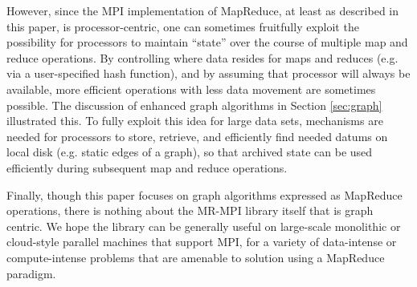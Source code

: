However, since the MPI implementation of MapReduce, at least as
described in this paper, is processor-centric, one can sometimes
fruitfully exploit the possibility for processors to maintain
``state'' over the course of multiple map and reduce operations.  By
controlling where data resides for maps and reduces (e.g. via a
user-specified hash function), and by assuming that processor will
always be available, more efficient operations with less data movement
are sometimes possible.  The discussion of enhanced graph algorithms
in Section \ref{sec:graph} illustrated this.  To fully exploit this
idea for large data sets, mechanisms are needed for processors to
store, retrieve, and efficiently find needed datums on local disk
(e.g. static edges of a graph), so that archived state can be used
efficiently during subsequent map and reduce operations.

Finally, though this paper focuses on graph algorithms expressed as
MapReduce operations, there is nothing about the MR-MPI library itself
that is graph centric.  We hope the library can be generally useful on
large-scale monolithic or cloud-style parallel machines that support
MPI, for a variety of data-intense or compute-intense problems that
are amenable to solution using a MapReduce paradigm.
